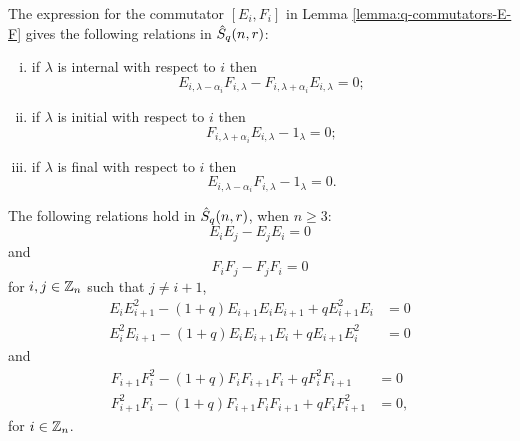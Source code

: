 \documentclass[a4paper, 11pt, twoside]{report}
\begin{document}
The expression for the commutator $\left[E_i,F_i\right]$ in Lemma \ref{lemma:q-commutators-E-F} gives the following relations in $\hat{S}_q(n,r)$:
\begin{enumerate}[i.]
\item
if $\lambda$ is internal with respect to $i$ then
\begin{equation*}
E_{i,\lambda-\alpha_i}F_{i,\lambda} -F_{i,\lambda+\alpha_i}E_{i,\lambda} = 0;
\end{equation*}
\item
if $\lambda$ is initial with respect to $i$ then
\begin{equation*}
F_{i,\lambda+\alpha_i}E_{i,\lambda} - 1_{\lambda} = 0;
\end{equation*}
\item
if $\lambda$ is final with respect to $i$ then
\begin{equation*}
E_{i,\lambda-\alpha_i}F_{i,\lambda} - 1_{\lambda} = 0.
\end{equation*}
\end{enumerate}

\begin{lemma}\label{lemma:q-serre-relations}
The following relations hold in $\hat{S}_q(n,r)$, when $n\geq 3$:
\begin{equation*}
E_i E_j - E_j E_i = 0
\end{equation*}
and
\begin{equation*}
F_i F_j - F_j F_i = 0
\end{equation*}
for $i,j\in\mathbb{Z}_n$ such that $j\neq i+1$,
\begin{align*}
E_i E_{i+1}^2 - (1+q)E_{i+1} E_i E_{i+1} + qE_{i+1}^2 E_i &= 0\\
E_i^2 E_{i+1} - (1+q)E_i E_{i+1} E_i + qE_{i+1} E_i^2 &= 0
\end{align*}
and
\begin{align*}
F_{i+1} F_i^2 - (1+q) F_i F_{i+1} F_i + qF_i^2 F_{i+1} &=0\\
F_{i+1}^2 F_i - (1+q) F_{i+1} F_i F_{i+1} + q F_i F_{i+1}^2 &= 0,
\end{align*}
for $i\in\mathbb{Z}_n$.
\end{lemma}
\end{document}
